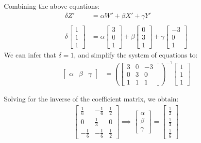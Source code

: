 \documentclass[12pt, oneside]{article}
\begin{document}
  Combining the above equations:
  \begin{align*}
  \delta Z' &= \alpha W' + \beta X' + \gamma Y' \\ \\
  \delta  \begin{bmatrix}
  1 		\\
  1 		\\
  1		
  \end{bmatrix}  &= \alpha  \begin{bmatrix}
  3		\\
  0 		\\
  1		
  \end{bmatrix} +
  \beta \begin{bmatrix}
  0 		\\
  3 		\\
  1		
  \end{bmatrix} + \gamma  \begin{bmatrix}
  -3 		\\
  0 		\\
  1		
  \end{bmatrix} 
  \end{align*} 
  We can infer that $\delta = 1$, and simplify the system of equations to:
  \begin{align*}
  \begin{bmatrix}
  \alpha & \beta & \gamma
  \end{bmatrix}  &= \left(\begin{bmatrix}
  3 & 0 & -3 		\\
  0 & 3  & 0		\\
  1 & 1  & 1	
  \end{bmatrix} \right) ^{-1}
  \begin{bmatrix}
  1		\\
  1 		\\
  1		
  \end{bmatrix}
  \end{align*} 
  
  Solving for the inverse of the coefficient matrix, we obtain:
  \begin{align*}
  \begin{bmatrix}
  \frac{1}{6} & -\frac{1}{6} & \frac{1}{2}	\\
  0 & \frac{1}{3} & 0		\\
  -\frac{1}{6}  & -\frac{1}{6}  & \frac{1}{2}	
  \end{bmatrix} \implies 
  \begin{bmatrix}
  \alpha \\
  \beta \\
  \gamma
  \end{bmatrix} = 
  \begin{bmatrix}
  \frac{1}{2} \\
  \frac{1}{3} \\
  \frac{1}{6}
  \end{bmatrix} 
  \end{align*}
  
\end{document}
